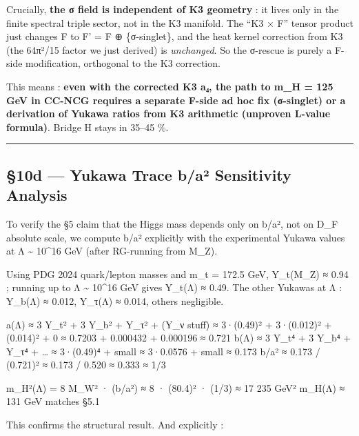 \documentclass[
  11pt,
  a4paper,
]{article}
\begin{document}
Crucially, \textbf{the σ field is independent of K3 geometry} : it lives only in the finite spectral triple sector, not in the K3 manifold. The ``K3 × F'' tensor product just changes F to F' = F ⊕ \{σ-singlet\}, and the heat kernel correction from K3 (the 64π²/15 factor we just derived) is \emph{unchanged}. So the σ-rescue is purely a F-side modification, orthogonal to the K3 correction.

This means : \textbf{even with the corrected K3 a₄, the path to m\_H = 125 GeV in CC-NCG requires a separate F-side ad hoc fix (σ-singlet) or a derivation of Yukawa ratios from K3 arithmetic (unproven L-value formula)}. Bridge H stays in 35--45 \%.

\begin{center}\rule{0.5\linewidth}{0.5pt}\end{center}

\hypertarget{d-yukawa-trace-bauxb2-sensitivity-analysis}{%
\subsection{§10d --- Yukawa Trace b/a² Sensitivity Analysis}\label{d-yukawa-trace-bauxb2-sensitivity-analysis}}

To verify the §5 claim that the Higgs mass depends only on b/a², not on \textbar D\_F\textbar{} absolute scale, we compute b/a² explicitly with the experimental Yukawa values at Λ \textasciitilde{} 10\^{}16 GeV (after RG-running from M\_Z).

Using PDG 2024 quark/lepton masses and m\_t = 172.5 GeV, Y\_t(M\_Z) ≈ 0.94 ; running up to Λ \textasciitilde{} 10\^{}16 GeV gives Y\_t(Λ) ≈ 0.49. The other Yukawas at Λ : Y\_b(Λ) ≈ 0.012, Y\_τ(Λ) ≈ 0.014, others negligible.

a(Λ) ≈ 3 Y\_t² + 3 Y\_b² + Y\_τ² + (Y\_ν stuff) ≈ 3·(0.49)² + 3·(0.012)² + (0.014)² + 0 ≈ 0.7203 + 0.000432 + 0.000196 ≈ 0.721
b(Λ) ≈ 3 Y\_t⁴ + 3 Y\_b⁴ + Y\_τ⁴ + \ldots{} ≈ 3·(0.49)⁴ + small ≈ 3·0.0576 + small ≈ 0.173
b/a² ≈ 0.173 / (0.721)² ≈ 0.173 / 0.520 ≈ 0.333 ≈ 1/3

m\_H²(Λ) = 8 M\_W² · (b/a²) ≈ 8 · (80.4)² · (1/3) ≈ 17 235 GeV²
m\_H(Λ) ≈ 131 GeV matches §5.1

This confirms the structural result. And explicitly :
\end{document}
